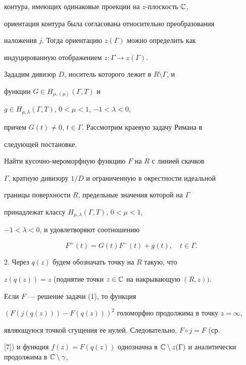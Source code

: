 контура, имеющих одинаковые проекции на $z$-плоскость $\Bbb C$,


ориентация контура была согласована относительно преобразования


наложения $j$. Тогда ориентацию $z(\Gamma)$ можно определить как


индуцированную отображением $z:\Gamma \to z(\Gamma)$.





Зададим дивизор $D$, носитель которого лежит в $R\setminus \Gamma$, и


функции $G \in H_{\mu, (\mu)}(\Gamma, T)$ и


$g \in H_{\mu, \lambda}(\Gamma, T)$, $0<\mu < 1$, $-1<\lambda <0$,


причем $G(t)\ne 0$, $t\in \Gamma$. Рассмотрим краевую задачу Римана в


следующей постановке.





Найти кусочно-мероморфную функцию $F$ на $R$ с линией скачков


$\Gamma$, кратную дивизору $1/D$ и ограниченную в окрестности идеальной


границы поверхности $R$, предельные значения которой на $\Gamma$


принадлежат классу $H_{\mu, \lambda}(\Gamma, T)$, $0<\mu <1$,


$-1<\lambda<0$, и удовлетворяют соотношению


\begin{equation}


F^+(t)=G(t)F^-(t)+g(t),\quad t\in \Gamma.


\end{equation}





2. Через $q(z)$ будем обозначать точку на $R$ такую, что


$z(q(z))=z$ (поднятие точки $z\in\Bbb C$ на накрывающую $(R,z))$.


Если $F$ --- решение задачи (1), то функция


$(F(j(q(z)))-F(q(z)))^2$ голоморфно продолжима в точку $z=\infty$,


являющуюся точкой сгущения ее нулей. Следовательно, $F\circ j=F$ (ср.


[7]) и функция $f(z)=F(q(z))$ однозначна в $\Bbb C\setminus


z(\Gamma)$ и аналитически продолжима в $\Bbb C\setminus\gamma$,


